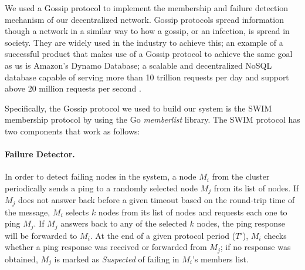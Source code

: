 We used a Gossip protocol to implement the membership and failure detection mechanism of our decentralized network. Gossip protocols spread information though a network in a similar way to how a gossip, or an infection, is spread in society. They are widely used in the industry to achieve this; an example of a successful product that makes use of a Gossip protocol to achieve the same goal as us is Amazon's Dynamo Database\cite{dynamo_paper}; a scalable and decentralized NoSQL database capable of serving more than 10 trillion requests per day and support above 20 million requests per second \cite{dynamo_web}.

Specifically, the Gossip protocol we used to build our system is the SWIM membership protocol\cite{SWIM} by using the Go \textit{memberlist} library\cite{memberlist}. The SWIM protocol has two components that work as follows\cite{SWIM}:

\paragraph*{Failure Detector.} In order to detect failing nodes in the system, a node $M_{i}$ from the cluster periodically sends a ping to a randomly selected node $M_{j}$ from its list of nodes. If $M_{j}$ does not answer back before a given timeout based on the round-trip time of the message, $M_{i}$ selects $k$ nodes from its list of nodes and requests each one to ping $M_{j}$. If $M_{j}$ answers back to any of the selected $k$ nodes, the ping response will be forwarded to $M_{i}$. At the end of a given protocol period ($T'$), $M_{i}$ checks whether a ping response was received or forwarded from $M_{j}$; if no response was obtained, $M_{j}$ is marked as \textit{Suspected} of failing in $M_{i}$'s members list.


